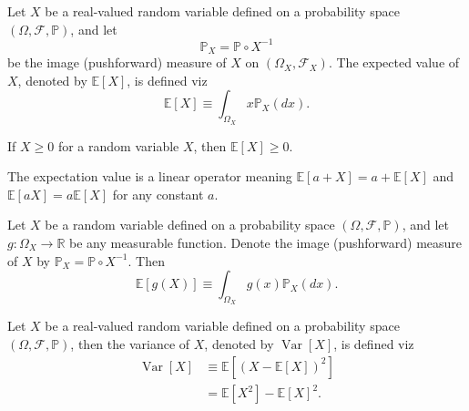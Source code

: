\begin{definition}
	\label{def:expectation_image}
	Let $X$ be a real-valued random variable defined on a probability space $(\Omega, \mathcal{F},\mathbb{P})$, and let
	\begin{equation}
		\mathbb{P}_X = \mathbb{P} \circ X^{-1}
	\end{equation} 
	be the image (pushforward) measure of $X$ on $(\Omega_X, \mathcal{F}_X)$. The expected value of $X$, denoted by $\mathbb{E}[X]$, is defined viz
	\begin{equation}
		\mathbb{E}[X] \equiv \int_{\Omega_X} x \mathbb{P}_X(dx).
		\label{eq:expected_value_image}
	\end{equation}
\end{definition}

\begin{theorem}
	If $X\geq 0$ for a random variable $X$, then $\mathbb{E}[X]\geq 0$.
\end{theorem}
\begin{theorem}
	\label{theorem:exp_linear}
	The expectation value is a linear operator meaning $\mathbb{E}[a+X] = a+\mathbb{E}[X]$ and $\mathbb{E}[aX] = a\mathbb{E}[X]$ for any constant $a$.
\end{theorem}
\begin{theorem}
	\label{th:lotus}
	Let $X$ be a random variable defined on a probability space $(\Omega, \mathcal{F}, \mathbb{P})$, and let $g: \Omega_X \to \mathbb{R}$ be any measurable function. Denote the image (pushforward) measure of $X$ by $\mathbb{P}_X = \mathbb{P} \circ X^{-1}$. Then
	\begin{equation}
		\mathbb{E}[g(X)] \equiv \int_{\Omega_X} g(x) \mathbb{P}_X(dx).
		\label{eq:lotus_image}
	\end{equation}
\end{theorem}

\begin{definition}[Variance]
	\label{def:variance}
	Let $X$ be a real-valued random variable defined on a probability space $(\Omega, \mathcal{F},\mathbb{P})$, then the variance of $X$, denoted by $\operatorname{Var}[X]$, is defined viz
	\begin{equation}
		\begin{split}
			\operatorname{Var}[X]&\equiv \mathbb{E}[(X-\mathbb{E}[X])^2]\\
			&= \mathbb{E}[X^2]-\mathbb{E}[X]^2.
		\end{split}
	\end{equation}
\end{definition}

